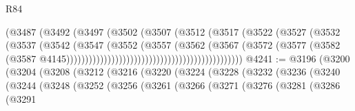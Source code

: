 \begin{lexlean}{R84}
\begin{coremodule}
                                                        (@3487
                                                          (@3492
                                                            (@3497
                                                              (@3502
                                                                (@3507
                                                                  (@3512
                                                                    (@3517
                                                                      (@3522
                                                                        (@3527
                                                                          (@3532
                                                                            (@3537
                                                                              (@3542
                                                                                (@3547
                                                                                  (@3552
                                                                                    (@3557
                                                                                      (@3562
                                                                                        (@3567
                                                                                          (@3572
                                                                                            (@3577
                                                                                              (@3582
                                                                                                (@3587
                                                                                                  @4145)))))))))))))))))))))))))))))))))))))))))))))))
@4241 := @3196
    (@3200
      (@3204
        (@3208
          (@3212
            (@3216
              (@3220
                (@3224
                  (@3228
                    (@3232
                      (@3236
                        (@3240
                          (@3244
                            (@3248
                              (@3252
                                (@3256
                                  (@3261
                                    (@3266
                                      (@3271
                                        (@3276
                                          (@3281
                                            (@3286
                                              (@3291

\end{coremodule}
\end{lexlean}
